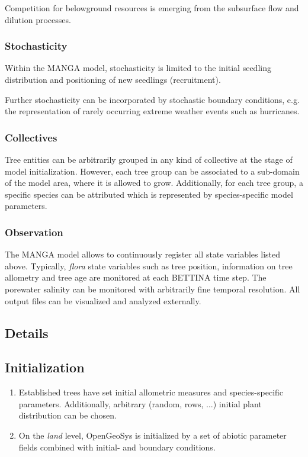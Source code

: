 Competition for belowground resources is emerging from the subsurface flow and dilution processes.
\subsubsection{Stochasticity}
Within the MANGA model, stochasticity is limited to the initial seedling distribution and positioning of new seedlings (recruitment).

Further stochasticity can be incorporated by stochastic boundary conditions, e.g. the representation of rarely occurring extreme weather events such as hurricanes.
\subsubsection{Collectives}
Tree entities can be arbitrarily grouped in any kind of collective at the stage of model initialization. 
However, each tree group can be associated to a sub-domain of the model area, where it is allowed to grow.
Additionally, for each tree group, a specific species can be attributed which is represented by species-specific model parameters.
\subsubsection{Observation}
The MANGA model allows to continuously register all state variables listed above.
Typically, \textit{flora} state variables such as tree position, information on tree allometry and tree age are monitored at each BETTINA time step.
The porewater salinity can be monitored with arbitrarily fine temporal resolution.
All output files can be visualized and analyzed externally.

\subsection*{Details}
\subsection{Initialization}

\begin{enumerate}
\item Established trees have set initial allometric measures and species-specific parameters.
Additionally, arbitrary (random, rows, ...) initial plant distribution can be chosen.
\item On the \textit{land} level, OpenGeoSys is initialized by a set of abiotic parameter fields combined with initial- and boundary conditions.
\end{enumerate}

